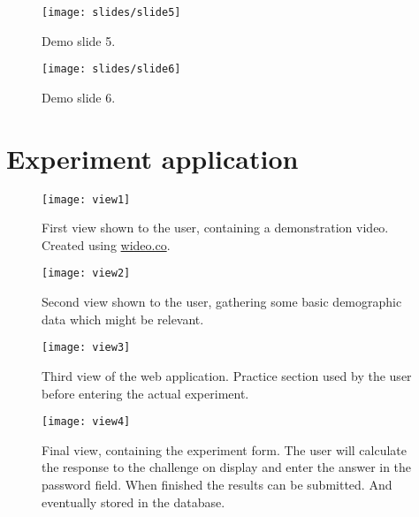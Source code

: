 \begin{figure}
    \texttt{[image: slides/slide5]}
    \caption{Demo slide 5.}
    \label{slide5}
\end{figure}


\begin{figure}
    \texttt{[image: slides/slide6]}
    \caption{Demo slide 6.}
    \label{slide6}
\end{figure}

\cleardoublepage




\chapter{Experiment application}\label{experiment-views}

\begin{figure}
    \texttt{[image: view1]}
    \caption{First view shown to the user, containing a demonstration video. Created using \url{wideo.co}.}
    \label{view1}
\end{figure}

\begin{figure}
    \texttt{[image: view2]}
    \caption{Second view shown to the user, gathering some basic demographic data which might be relevant. }
    \label{view2}
\end{figure}

\begin{figure}
    \texttt{[image: view3]}
    \caption{Third view of the web application. Practice section used by the user before entering the actual experiment.}
    \label{view3}
\end{figure}

\begin{figure}
    \texttt{[image: view4]}
    \caption{Final view, containing the experiment form. The user will calculate the response to the challenge on display and enter the answer in the password field. When finished the results can be submitted. And eventually stored in the database.}
    \label{view4}
\end{figure}

